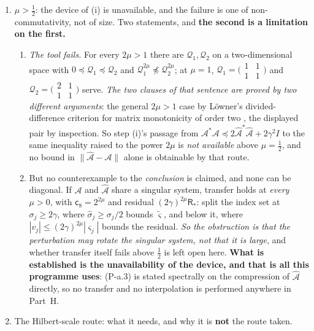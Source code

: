 \begin{lemma}
\begin{enumerate}
\item[(ii)] $\mu>\tfrac12$: the device of (i) is unavailable, and the failure is one of
non-commutativity, not of size. Two statements, and \textbf{the second is a limitation on the first.}
\begin{enumerate}
\item[(ii.a)] \emph{The tool fails.} For every $2\mu>1$ there are $\mathcal Q_1,\mathcal Q_2$ on a
two-dimensional space with $0\preceq\mathcal Q_1\preceq\mathcal Q_2$ and
$\mathcal Q_1^{2\mu}\not\preceq\mathcal Q_2^{2\mu}$; at $\mu=1$,
$\mathcal Q_1=\big(\begin{smallmatrix}1&1\\1&1\end{smallmatrix}\big)$ and
$\mathcal Q_2=\big(\begin{smallmatrix}2&1\\1&1\end{smallmatrix}\big)$ serve. \emph{The two clauses of
that sentence are proved by two different arguments}: the general $2\mu>1$ case by L\"owner's
divided-difference criterion for matrix monotonicity of order two \citep[Ch.~V]{bhatia1997}, the
displayed pair by inspection. So step (i)'s passage from
$\mathcal A^\ast\mathcal A\preceq2\hat{\mathcal A}^\ast\hat{\mathcal A}+2\gamma^{2}I$ to the same
inequality raised to the power $2\mu$ is \emph{not available} above $\mu=\tfrac12$, and no bound in
$\|\hat{\mathcal A}-\mathcal A\|$ alone is obtainable by that route.
\item[(ii.b)] But no counterexample to the \emph{conclusion} is claimed, and none can be
diagonal. If $\mathcal A$ and $\hat{\mathcal A}$ share a singular system, transfer holds at
\emph{every} $\mu>0$, with $\mathsf c_8=2^{2\mu}$ and residual $(2\gamma)^{2\mu}\mathsf R_\ast$: split the
index set at $\sigma_j\ge2\gamma$, where $\hat\sigma_j\ge\sigma_j/2$ bounds $\tilde\varsigma$, and
below it, where $|v_j|\le(2\gamma)^{2\mu}|\varsigma_j|$ bounds the residual. \emph{So the obstruction is
that the perturbation may rotate the singular system, not that it is large}, and whether transfer
itself fails above $\tfrac12$ is left open here. \textbf{What is established is the unavailability of
the device, and that is all this programme uses}: (P-a.3) is stated spectrally on the compression of
$\hat{\mathcal A}$ directly, so no transfer and no interpolation is performed anywhere in Part~H.
\end{enumerate}
\item[(iii)] The Hilbert-scale route: what it needs, and why it is \textbf{not} the route taken.

\end{enumerate}
\end{lemma}
